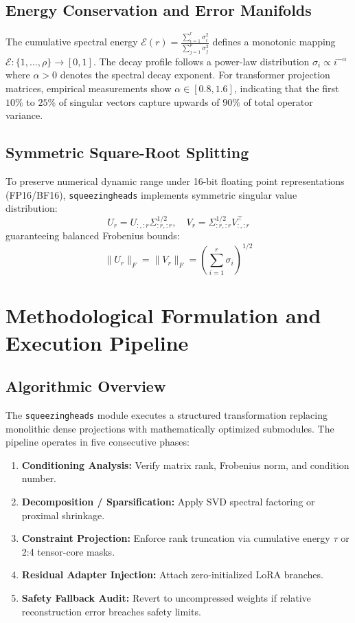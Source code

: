 \subsection{Energy Conservation and Error Manifolds}
The cumulative spectral energy $\mathcal{E}(r) = \frac{\sum_{i=1}^r \sigma_i^2}{\sum_{j=1}^\rho \sigma_j^2}$ defines a monotonic mapping $\mathcal{E}: \{1, \dots, \rho\} \to [0, 1]$. The decay profile follows a power-law distribution $\sigma_i \propto i^{-\alpha}$ where $\alpha > 0$ denotes the spectral decay exponent. For transformer projection matrices, empirical measurements show $\alpha \in [0.8, 1.6]$, indicating that the first $10\%$ to $25\%$ of singular vectors capture upwards of $90\%$ of total operator variance.

\subsection{Symmetric Square-Root Splitting}
To preserve numerical dynamic range under 16-bit floating point representations (FP16/BF16), \texttt{squeezingheads} implements symmetric singular value distribution:
\[
U_r = U_{:, :r} \Sigma_{:r, :r}^{1/2}, \quad V_r = \Sigma_{:r, :r}^{1/2} V_{:, :r}^\top
\]
guaranteeing balanced Frobenius bounds:
\[
\|U_r\|_F = \|V_r\|_F = \left( \sum_{i=1}^{r} \sigma_i \right)^{1/2}
\]


\section{Methodological Formulation and Execution Pipeline}

\subsection{Algorithmic Overview}
The \texttt{squeezingheads} module executes a structured transformation replacing monolithic dense projections with mathematically optimized submodules. The pipeline operates in five consecutive phases:
\begin{enumerate}
\item \textbf{Conditioning Analysis:} Verify matrix rank, Frobenius norm, and condition number.
\item \textbf{Decomposition / Sparsification:} Apply SVD spectral factoring or proximal shrinkage.
\item \textbf{Constraint Projection:} Enforce rank truncation via cumulative energy $\tau$ or 2:4 tensor-core masks.
\item \textbf{Residual Adapter Injection:} Attach zero-initialized LoRA branches.
\item \textbf{Safety Fallback Audit:} Revert to uncompressed weights if relative reconstruction error breaches safety limits.
\end{enumerate}

